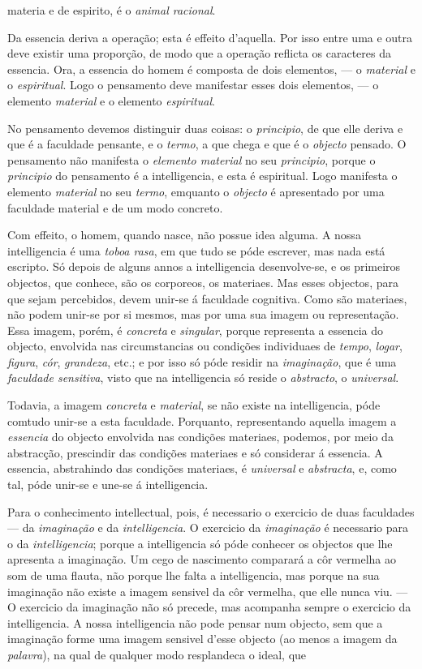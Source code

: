 materia e de espirito, é o \emph{animal racional}.\par Da essencia deriva a operação; esta é effeito d'aquella. Por isso entre uma e outra deve existir uma proporção, de modo que a operação reflicta os caracteres da essencia. Ora, a essencia do homem é composta de dois elementos, --- o \emph{material} e o \emph{espiritual}. Logo o pensamento deve manifestar esses dois elementos, --- o elemento \emph{material} e o elemento \emph{espiritual}.\par No pensamento devemos distinguir duas coisas: o \emph{principio}, de que elle deriva e que é a faculdade pensante, e o \emph{termo}, a que chega e que é o \emph{objecto} pensado. O pensamento não manifesta o \emph{elemento material} no seu \emph{principio}, porque o \emph{principio} do pensamento é a intelligencia, e esta é espiritual. Logo manifesta o elemento \emph{material} no seu \emph{termo}, emquanto o \emph{objecto} é apresentado por uma faculdade material e de um modo concreto.\par Com effeito, o homem, quando nasce, não possue idea alguma. A nossa intelligencia é uma \emph{toboa rasa}, em que tudo se póde escrever, mas nada está escripto. Só depois de alguns annos a intelligencia desenvolve-se, e os primeiros objectos, que conhece, são os corporeos, os materiaes. Mas esses objectos, para que sejam percebidos, devem unir-se á faculdade cognitiva. Como são materiaes, não podem unir-se por si mesmos, mas por uma sua imagem ou representação. Essa imagem, porém, é \emph{concreta} e \emph{singular}, porque representa a essencia do objecto, envolvida nas circumstancias ou condições individuaes de \emph{tempo}, \emph{logar}, \emph{figura}, \emph{cór}, \emph{grandeza}, etc.; e por isso só póde residir na \emph{imaginação}, que é uma \emph{faculdade sensitiva}, visto que na intelligencia só reside o \emph{abstracto}, o \emph{universal}.\par Todavia, a imagem \emph{concreta} e \emph{material}, se não existe na intelligencia, póde comtudo unir-se a esta faculdade. Porquanto, representando aquella imagem a \emph{essencia} do objecto envolvida nas condições materiaes, podemos, por meio da abstracção, prescindir das condições materiaes e só considerar á essencia. A essencia, abstrahindo das condições materiaes, é \emph{universal} e \emph{abstracta}, e, como tal, póde unir-se e une-se á intelligencia.\par Para o conhecimento intellectual, pois, é necessario o exercicio de duas faculdades --- da \emph{imaginação} e da \emph{intelligencia}. O exercicio da \emph{imaginação} é necessario para o da \emph{intelligencia}; porque a intelligencia só póde conhecer os objectos que lhe apresenta a imaginação. Um cego de nascimento comparará a côr vermelha ao som de uma flauta, não porque lhe falta a intelligencia, mas porque na sua imaginação não existe a imagem sensivel da côr vermelha, que elle nunca viu. --- O exercicio da imaginação não só precede, mas acompanha sempre o exercicio da intelligencia. A nossa intelligencia não pode pensar num objecto, sem que a imaginação forme uma imagem sensivel d'esse objecto (ao menos a imagem da \emph{palavra}), na qual de qualquer modo resplandeca o ideal, que 